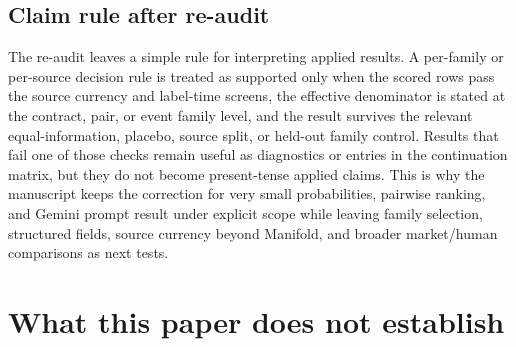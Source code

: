 \documentclass[11pt]{article}
\begin{document}
\subsection{Claim rule after re-audit}

The re-audit leaves a simple rule for interpreting applied results. A per-family or per-source decision rule is treated as supported only when the scored rows pass the source currency and label-time screens, the effective denominator is stated at the contract, pair, or event family level, and the result survives the relevant equal-information, placebo, source split, or held-out family control. Results that fail one of those checks remain useful as diagnostics or entries in the continuation matrix, but they do not become present-tense applied claims. This is why the manuscript keeps the correction for very small probabilities, pairwise ranking, and Gemini prompt result under explicit scope while leaving family selection, structured fields, source currency beyond Manifold, and broader market/human comparisons as next tests.

\section{What this paper does not establish}
\label{sec:limits}
\end{document}
